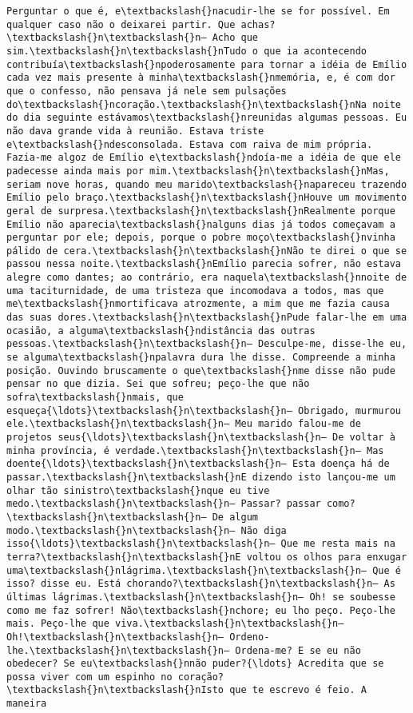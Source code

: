 \begin{Verbatim}[commandchars=\\\{\}]
Perguntar o que é, e\textbackslash{}nacudir-lhe se for possível. Em qualquer caso não o deixarei partir. Que achas?\textbackslash{}n\textbackslash{}n— Acho que sim.\textbackslash{}n\textbackslash{}nTudo o que ia acontecendo contribuía\textbackslash{}npoderosamente para tornar a idéia de Emílio cada vez mais presente à minha\textbackslash{}nmemória, e, é com dor que o confesso, não pensava já nele sem pulsações do\textbackslash{}ncoração.\textbackslash{}n\textbackslash{}nNa noite do dia seguinte estávamos\textbackslash{}nreunidas algumas pessoas. Eu não dava grande vida à reunião. Estava triste e\textbackslash{}ndesconsolada. Estava com raiva de mim própria. Fazia-me algoz de Emílio e\textbackslash{}ndoía-me a idéia de que ele padecesse ainda mais por mim.\textbackslash{}n\textbackslash{}nMas, seriam nove horas, quando meu marido\textbackslash{}napareceu trazendo Emílio pelo braço.\textbackslash{}n\textbackslash{}nHouve um movimento geral de surpresa.\textbackslash{}n\textbackslash{}nRealmente porque Emílio não aparecia\textbackslash{}nalguns dias já todos começavam a perguntar por ele; depois, porque o pobre moço\textbackslash{}nvinha pálido de cera.\textbackslash{}n\textbackslash{}nNão te direi o que se passou nessa noite.\textbackslash{}nEmílio parecia sofrer, não estava alegre como dantes; ao contrário, era naquela\textbackslash{}nnoite de uma taciturnidade, de uma tristeza que incomodava a todos, mas que me\textbackslash{}nmortificava atrozmente, a mim que me fazia causa das suas dores.\textbackslash{}n\textbackslash{}nPude falar-lhe em uma ocasião, a alguma\textbackslash{}ndistância das outras pessoas.\textbackslash{}n\textbackslash{}n— Desculpe-me, disse-lhe eu, se alguma\textbackslash{}npalavra dura lhe disse. Compreende a minha posição. Ouvindo bruscamente o que\textbackslash{}nme disse não pude pensar no que dizia. Sei que sofreu; peço-lhe que não sofra\textbackslash{}nmais, que esqueça{\ldots}\textbackslash{}n\textbackslash{}n— Obrigado, murmurou ele.\textbackslash{}n\textbackslash{}n— Meu marido falou-me de projetos seus{\ldots}\textbackslash{}n\textbackslash{}n— De voltar à minha província, é verdade.\textbackslash{}n\textbackslash{}n— Mas doente{\ldots}\textbackslash{}n\textbackslash{}n— Esta doença há de passar.\textbackslash{}n\textbackslash{}nE dizendo isto lançou-me um olhar tão sinistro\textbackslash{}nque eu tive medo.\textbackslash{}n\textbackslash{}n— Passar? passar como?\textbackslash{}n\textbackslash{}n— De algum modo.\textbackslash{}n\textbackslash{}n— Não diga isso{\ldots}\textbackslash{}n\textbackslash{}n— Que me resta mais na terra?\textbackslash{}n\textbackslash{}nE voltou os olhos para enxugar uma\textbackslash{}nlágrima.\textbackslash{}n\textbackslash{}n— Que é isso? disse eu. Está chorando?\textbackslash{}n\textbackslash{}n— As últimas lágrimas.\textbackslash{}n\textbackslash{}n— Oh! se soubesse como me faz sofrer! Não\textbackslash{}nchore; eu lho peço. Peço-lhe mais. Peço-lhe que viva.\textbackslash{}n\textbackslash{}n— Oh!\textbackslash{}n\textbackslash{}n— Ordeno-lhe.\textbackslash{}n\textbackslash{}n— Ordena-me? E se eu não obedecer? Se eu\textbackslash{}nnão puder?{\ldots} Acredita que se possa viver com um espinho no coração?\textbackslash{}n\textbackslash{}nIsto que te escrevo é feio. A maneira 
\end{Verbatim}
